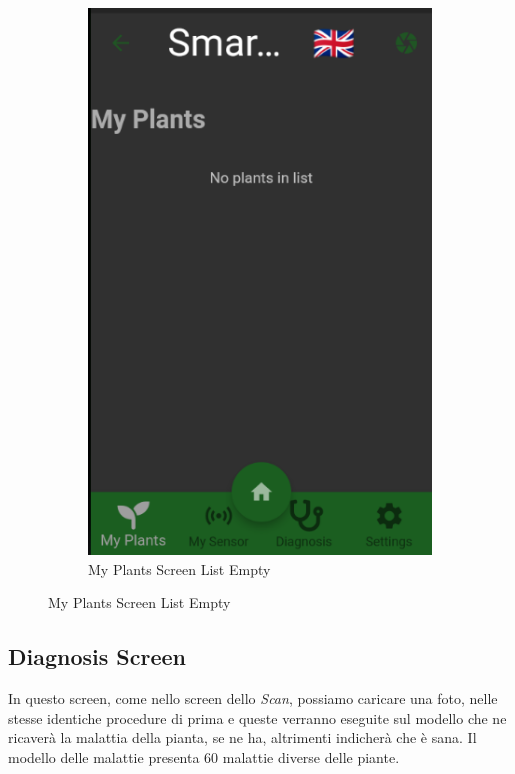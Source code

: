 \documentclass[a4paper,12pt]{report}
\begin{document}
\begin{figure}[H]
\begin{subfigure}{0.3\textwidth}
		\includegraphics[width=\textwidth]{./images/my_plants/my_plants_screen.png}
		\caption{My Plants Screen List Empty}
		\label{fig:my_plants_list_empty}
	\end{subfigure}
\end{figure}

\subsection{Diagnosis Screen}

\textsf{\small In questo screen, come nello screen dello \emph{Scan}, possiamo caricare una foto, nelle stesse identiche procedure di prima e queste verranno eseguite sul modello che ne ricaverà la malattia della pianta, se ne ha, altrimenti indicherà che è sana.}
\textsf{\small Il modello delle malattie presenta 60 malattie diverse delle piante.}
\end{document}
